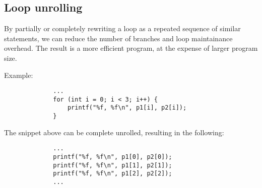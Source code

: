 \documentclass[twoside]{article}
\begin{document}
    \subsection{Loop unrolling}

    By partially or completely rewriting a loop as a repeated sequence of similar statements, we can reduce the number of branches and loop maintainance overhead.
    The result is a more efficient program, at the expense of larger program size.

    Example:

    \begin{figure}[h!]
        \centering
        \begin{verbatim}
        ...
        for (int i = 0; i < 3; i++) {
            printf("%f, %f\n", p1[i], p2[i]);
        }
        \end{verbatim}
    \end{figure}

    The snippet above can be complete unrolled, resulting in the following:

    \begin{figure}[h!]
        \centering
        \begin{verbatim}
        ...
        printf("%f, %f\n", p1[0], p2[0]);
        printf("%f, %f\n", p1[1], p2[1]);
        printf("%f, %f\n", p1[2], p2[2]);
        ...
        \end{verbatim}
    \end{figure}
\end{document}
